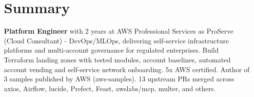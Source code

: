 \section{\textbf{Summary}}
\vspace{1pt}
\small{\textbf{Platform Engineer} with 2 years at AWS Professional Services as ProServe (Cloud Consultant) - DevOps/MLOps, delivering self-service infrastructure platforms and multi-account governance for regulated enterprises. Build Terraform landing zones with tested modules, account baselines, automated account vending and self-service network onboarding. 5x AWS certified. Author of 3 samples published by AWS (aws-samples). 13 upstream PRs merged across axios, Airflow, lucide, Prefect, Feast, awslabs/mcp, multer, and others.}
\vspace{-2mm}

